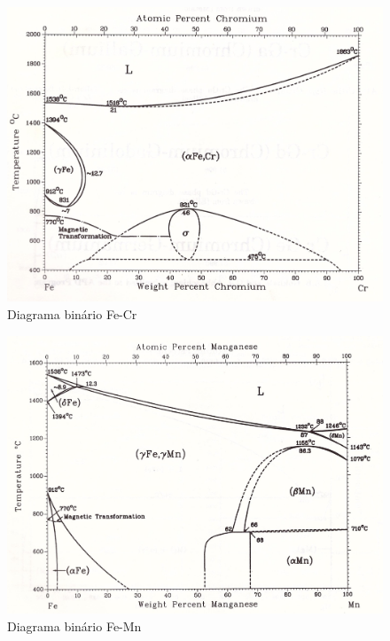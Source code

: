 \documentclass[brazil,tese,epusp]{usp}
\begin{document}
\begin{figure}
  \includegraphics[width=1.1\textwidth]{img/Fe-Cr.jpg}
  \caption{Diagrama binário Fe-Cr}
  \label{fig:bin_fe-cr}
\end{figure}

\begin{figure}
  \includegraphics[width=1.1\textwidth]{img/Fe-Mn.jpg}
  \caption{Diagrama binário Fe-Mn}
  \label{fig:bin_fe-mn}
\end{figure}
\end{document}
